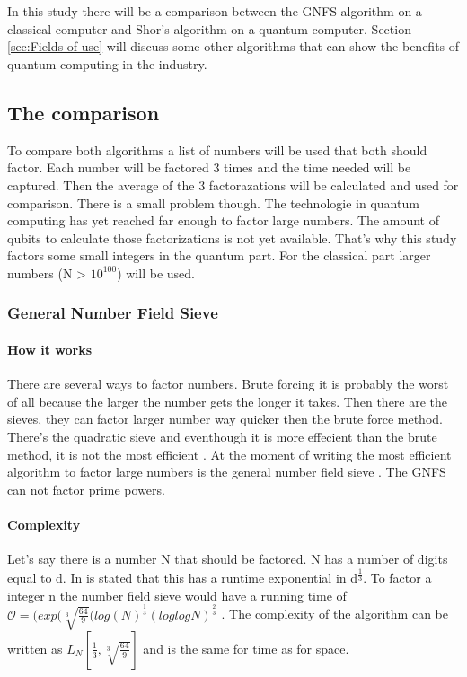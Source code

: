 
\chapter{}
\label{ch:onderzoek}



In this study there will be a comparison between the GNFS algorithm on a classical computer and Shor's algorithm on a quantum computer.
Section \ref{sec:Fields of use} will discuss some other algorithms that can show the benefits of quantum computing in the industry.
\section{The comparison}

To compare both algorithms a list of numbers will be used that both should factor. Each number will be factored 3 times and the time needed will be captured. Then the average of the 3 factorazations will be calculated and used for comparison.
There is a small problem though. The technologie in quantum computing has yet reached far enough to factor large numbers. The amount of qubits to calculate those factorizations is not yet available. 
That's why this study factors some small integers in the quantum part. For the classical part larger numbers (N > $10^100$) will be used.
\subsection{General Number Field Sieve}
\subsubsection{How it works}
There are several ways to factor numbers. Brute forcing it is probably the worst of all because the larger the number gets the longer it takes. Then there are the sieves, they can factor larger number way quicker then the brute force method.
There's the quadratic sieve and eventhough it is more effecient than the brute method, it is not the most efficient \autocite{Quadratic_sieve}. At the moment of writing the most efficient algorithm to factor large numbers is the general number field sieve \autocite{shor_algo}.
The GNFS can not factor prime powers.

\subsubsection{Complexity}
Let's say there is a number N that should be factored. N has a number of digits equal to d. In \textcite{shor_algo} is stated that this has a runtime exponential in d\textsuperscript{$\frac{1}{3}$}.
To factor a integer n the number field sieve would have a running time of $\mathcal{O} = (exp(\sqrt[3]{\frac{64}{9}}(log(N)^\frac{1}{3}(log log N)^\frac{2}{3}$ \autocite{nfscomp}.
The complexity of the algorithm can be written as $L_N[\frac{1}{3},\sqrt[3]{\frac{64}{9}}]$ and is the same for time as for space.

